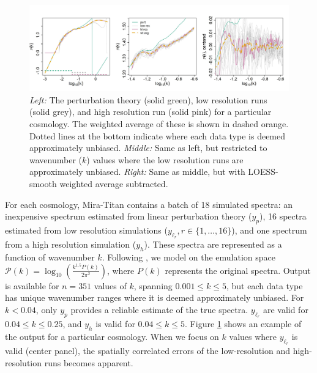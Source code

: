 \documentclass[11pt]{article}
\begin{document}
\begin{figure}[ht]
    \centering 
    \includegraphics[width=\linewidth]{plot_data.jpeg}
    \caption{{\it Left:} The perturbation theory (solid green), low resolution runs (solid grey), 
    and high resolution run  (solid pink) for a particular cosmology. 
    The weighted average of these is shown in dashed orange. Dotted lines at the bottom
    indicate where each data type is deemed approximately unbiased. 
    {\it Middle:} Same as left, but restricted to wavenumber ($k$) values where the low resolution 
    runs are approximately unbiased.
    {\it Right:} Same as middle, but with LOESS-smooth weighted average subtracted.}
    \label{fig:plot_data}
\end{figure}

For each cosmology, Mira-Titan contains a batch of 18 simulated spectra: an inexpensive 
spectrum estimated from linear perturbation theory ($y_p$), 16 spectra estimated from 
low resolution simulations ($y_{\ell_r}, r \in \{1,\dots,16\}$), and one spectrum from 
a high resolution simulation ($y_h$). 
These spectra are represented as a function of wavenumber $k$.  Following 
\cite{moran2023mira}, we model on the emulation space 
$\mathcal{P}(k)=\log_{10}\left(\frac{k^{1.5}P(k)}{2\pi^2}\right)$, where $P(k)$ represents the
original spectra. Output is available for $n=351$ values of $k$, spanning
$0.001 \leq k \leq 5$, but each data type has unique wavenumber ranges
where it is deemed approximately unbiased. For $k<0.04$, only $y_p$ provides a reliable 
estimate of the true spectra. $y_{\ell_r}$ are valid for $0.04 \leq k \leq 0.25$, and 
$y_h$ is valid for $0.04 \leq k \leq 5$.  Figure \ref{fig:plot_data} shows an example 
of the output for a particular cosmology. When we focus on $k$ values where $y_{\ell_r}$ 
is valid (center panel), the spatially correlated errors of the low-resolution and high-resolution runs 
becomes apparent.
\end{document}
